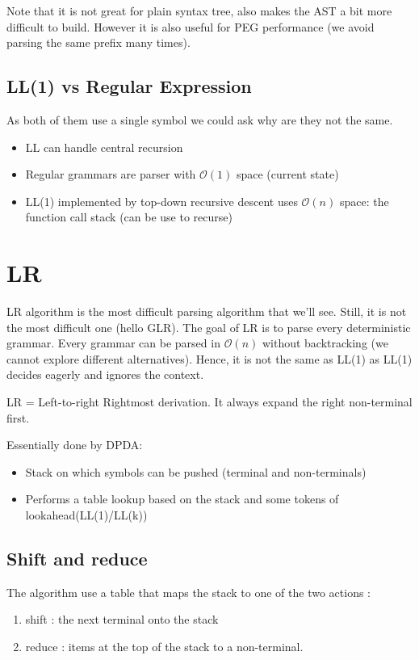                 Note that it is not great for plain syntax tree, also makes the
                AST a bit more difficult to build. However it is also useful for
                PEG performance (we avoid parsing the same prefix many times).
    \subsection{LL(1) vs Regular Expression}
        As both of them use a single symbol we could ask why are they not the same.
        \begin{itemize}
            \item LL can handle central recursion
            \item Regular grammars are parser with $\mathcal{O}(1)$ space (current state)
            \item LL(1) implemented by top-down recursive descent uses
            $\mathcal{O}(n)$ space: the function call stack (can be use to
            recurse) 
        \end{itemize}
\section{LR}
    LR algorithm is the most difficult parsing algorithm that we'll see. Still,
    it is not the most difficult one (hello GLR). The goal of LR is to parse
    every deterministic grammar. Every grammar can be parsed in $\mathcal{O}(n)$
    without backtracking (we cannot explore different alternatives). Hence, it
    is not the same as LL(1) as LL(1) decides eagerly and ignores the context.

    \theoremstyle{definition}
    \begin{definition}[LR parsing]
        LR = Left-to-right Rightmost derivation.
        It always expand the right non-terminal first.

        Essentially done by DPDA:
            \begin{itemize}
                \item Stack on which symbols can be pushed (terminal and
                non-terminals)
                \item Performs a table lookup based on the stack and some tokens
                of lookahead(LL(1)/LL(k))
            \end{itemize}
    \end{definition}
    \subsection{Shift and reduce}
        The algorithm use a table that maps the stack to one of the two actions : 
        \begin{enumerate}
            \item shift : the next terminal onto the stack
            \item reduce : items at the top of the stack to a non-terminal.
        \end{enumerate}
        
